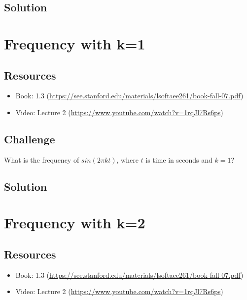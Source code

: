 \subsection*{Solution}


\timebox




\newpage

\section{Frequency with k=1}

\subsection*{Resources}
\begin{itemize}
    \item Book: 1.3 (\url{https://see.stanford.edu/materials/lsoftaee261/book-fall-07.pdf})
    \item Video: Lecture 2 (\url{https://www.youtube.com/watch?v=1rqJl7Rs6ps})
\end{itemize}

\subsection*{Challenge}
What is the frequency of $sin(2 \pi k t)$, where $t$ is time in seconds and $k=1$?

\subsection*{Solution}


\timebox




\newpage

\section{Frequency with k=2}

\subsection*{Resources}
\begin{itemize}
    \item Book: 1.3 (\url{https://see.stanford.edu/materials/lsoftaee261/book-fall-07.pdf})
    \item Video: Lecture 2 (\url{https://www.youtube.com/watch?v=1rqJl7Rs6ps})
\end{itemize}

